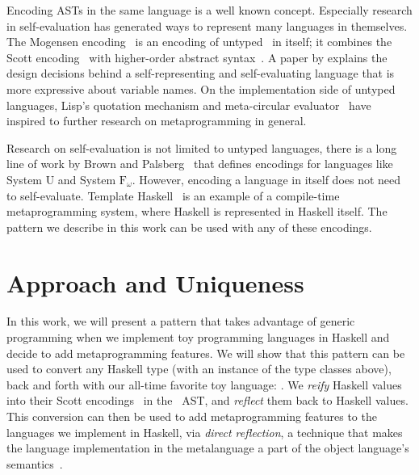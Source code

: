 \documentclass[format=acmsmall, review=false, screen=true]{acmart}
\begin{document}
Encoding ASTs in the same language is a well known concept.
Especially research in self-evaluation has generated ways to represent many
languages in themselves.  The Mogensen encoding~\cite{mogensen} is an encoding
of untyped \lc\ in itself; it combines the Scott encoding~\cite{scott} with
higher-order abstract syntax~\cite{hoas}.
A paper by \citet{stump2009directly} explains the design decisions behind a
self-representing and self-evaluating language that is more expressive about
variable names.  On the implementation side of untyped languages, Lisp's
quotation mechanism and meta-circular evaluator~\cite{mccarthy1965lisp}
have inspired to further research on metaprogramming in general.

Research on self-evaluation is not limited to untyped languages, there is a
long line of work by Brown and
Palsberg~\cite{brownU,brownBreaking,brownIntensional} that defines encodings
for languages like System U and System $\text{F}_\omega$.
However, encoding a language in itself does not need to self-evaluate.
Template Haskell~\cite{sheard2002template} is an example of a compile-time
metaprogramming system, where Haskell is represented in Haskell itself.
The pattern we describe in this work can be used with any of these encodings.


\section{Approach and Uniqueness}

In this work, we will present a pattern that takes advantage of generic programming
when we implement toy programming languages in Haskell and decide to add
metaprogramming features. We will show that this pattern
can be used to convert any Haskell type (with an instance of the type classes
above), back and forth with our all-time favorite toy language: \lc.
We \mbox{\emph{reify}} Haskell values into their Scott encodings~\cite{scott}
in the \lc\ AST, and \mbox{\emph{reflect}} them back to Haskell values.
This conversion can then be used to add metaprogramming features to the languages we implement in Haskell, via
  \emph{direct reflection}, a technique that makes the language implementation
  in the metalanguage a part of the object language's semantics~\cite{barzilayphd}.
\end{document}
